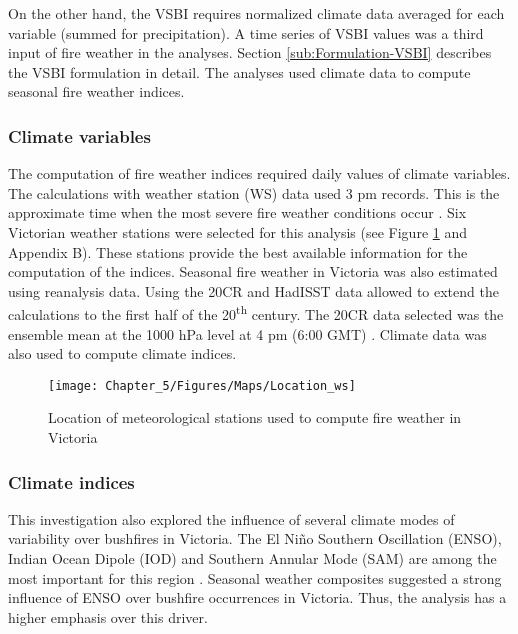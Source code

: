 On the other hand, the VSBI requires normalized climate data averaged
for each variable (summed for precipitation). A time series of VSBI
values was a third input of fire weather in the analyses. Section
\ref{sub:Formulation-VSBI} describes the VSBI formulation in detail.
The analyses used climate data to compute seasonal fire weather indices.


\subsubsection{Climate variables}

The computation of fire weather indices required daily values of climate
variables. The calculations with weather station (WS) data used 3
pm records. This is the approximate time when the most severe fire
weather conditions occur \citep{Lucas2010}. Six Victorian weather
stations were selected for this analysis (see Figure \ref{fig:Location of meteorological stations used to compute fire weather in Victoria}
and Appendix B). These stations provide the best available information
for the computation of the indices. Seasonal fire weather in Victoria
was also estimated using reanalysis data. Using the 20CR and HadISST
data allowed to extend the calculations to the first half of the 20\textsuperscript{th}
century. The 20CR data selected was the ensemble mean at the 1000
hPa level at 4 pm (6:00 GMT) . Climate data was also used to compute
climate indices.

\begin{figure}[h]
\noindent \begin{centering}
\texttt{[image: Chapter\_5/Figures/Maps/Location\_ws]}
\par\end{centering}

\caption[Location of meteorological stations used to compute fire weather in
Victoria]{Location of meteorological stations used to compute fire weather in
Victoria \label{fig:Location of meteorological stations used to compute fire weather in Victoria}}


\end{figure}



\subsubsection{Climate indices}

This investigation also explored the influence of several climate
modes of variability over bushfires in Victoria. The El Ni\~no Southern
Oscillation (ENSO), Indian Ocean Dipole (IOD) and Southern Annular
Mode (SAM) are among the most important for this region \citep{Gong1999,Williams2001,Cai2009,Risbey2009b,Ho2011,Ummenhofer2011,White2013}.
Seasonal weather composites suggested a strong influence of ENSO over
bushfire occurrences in Victoria. Thus, the analysis has a higher
emphasis over this driver. 

